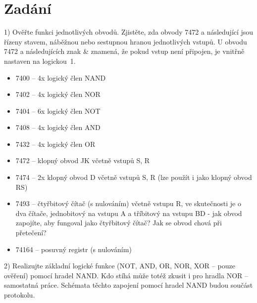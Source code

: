 \documentclass[a4paper]{article}
\begin{document}



\section*{Zadání}
1) Ověřte funkci jednotlivých obvodů. Zjistěte, zda obvody 7472 a následující jsou řízeny stavem, náběžnou nebo sestupnou hranou jednotlivých vstupů. U obvodu 7472 a následujících znak \& znamená, že pokud vstup není připojen, je vnitřně nastaven na logickou~1.\begin{itemize}
	\item 7400 – 4x logický člen NAND
	\item  7402 – 4x logický člen NOR
	\item 7404 – 6x logický člen NOT
	\item 7408 – 4x logický člen AND
	\item 7432 – 4x logický člen OR
	\item 7472 – klopný obvod JK včetně vstupů S, R
	\item 7474 – 2x klopný obvod D včetně vstupů S, R (lze použít i jako klopný obvod RS)
	\item 7493 – čtyřbitový čítač (s nulováním) včetně vstupu R, ve skutečnosti je o dva čítače, jednobitový na vstupu A a tříbitový na vstupu BD - jak obvod zapojíte, aby fungoval jako čtyřbitový čítač? Jak se obvod chová při přetečení?
	\item 74164 – posuvný registr (s nulováním)
\end{itemize}
2) Realizujte základní logické funkce (NOT, AND, OR, NOR, XOR – pouze ověření) pomocí hradel NAND. Kdo stíhá může totéž zkusit i pro hradla NOR – samostatná práce.
Schémata těchto zapojení pomocí hradel NAND budou součást protokolu. 
\end{document}
